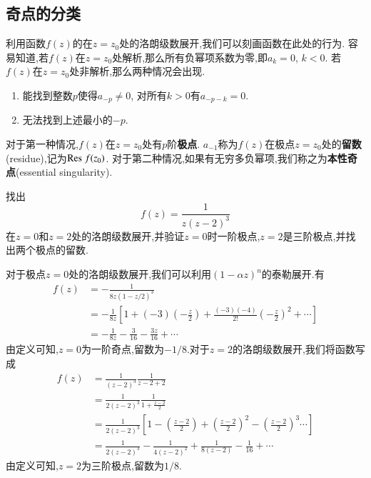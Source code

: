 \subsection{奇点的分类}
\label{subsec:singular_points}
利用函数$f(z)$的在$z=z_0$处的洛朗级数展开,我们可以刻画函数在此处的行为.
容易知道,若$f(z)$在$z=z_0$处解析,那么所有负幂项系数为零,即$a_k = 0$, $k<0$.
若$f(z)$在$z=z_0$处非解析,那么两种情况会出现.
\begin{enumerate}
    \item 能找到整数$p$使得$a_{-p} \neq 0$, 对所有$k>0$有$a_{-p - k}=0$.
    \item 无法找到上述最小的$-p$.
\end{enumerate}
对于第一种情况,$f(z)$在$z=z_0$处有$p$阶\textbf{极点}. $a_{-1}$称为$f(z)$在极点$z=z_0$处的\textbf{留数}(residue),记为${\mathrm{Res}\;} f(z_0)$.
对于第二种情况,如果有无穷多负幂项,我们称之为\textbf{本性奇点}(essential singularity).

\begin{example}
找出\[
    f(z) = \frac{1}{z( z- 2)^3} 
    \]
    在$z=0$和$z=2$处的洛朗级数展开,并验证$z=0$时一阶极点,$z=2$是三阶极点,并找出两个极点的留数.
\end{example}
\begin{solution}
对于极点$z=0$处的洛朗级数展开,我们可以利用$(1-\alpha z)^n$的泰勒展开.有
\[
    \begin{aligned}
    f(z) &= -\frac{1}{8z(1-z/2)^3}
    \\
     &= -\frac{1}{8z}\left[ 1 + (-3) (-\frac{z}{2}) + \frac{(-3)(-4)}{2!} \left( -\frac{z}{2}\right)^2 + \cdots \right] 
    \\
     &= -\frac{1}{8z} - \frac{3}{16} - \frac{3z}{16} + \cdots   
    \end{aligned}
\]
由定义可知,$z=0$为一阶奇点,留数为$-1/8$.对于$z=2$的洛朗级数展开,我们将函数写成
\[
    \begin{aligned}
        f(z) &= \frac{1}{(z-2)^3} \frac{1}{z-2 + 2}
        \\
        &= \frac{1}{2(z-2)^3} \frac{1}{1+\frac{z-2}{2}}
        \\
        &= \frac{1}{2(z-2)^3} \left[ 1 - \left(\frac{z-2}{2} \right) + \left(\frac{z-2}{2}\right)^2 - \left(\frac{z-2}{2}\right)^3 \cdots \right] 
        \\
        &= \frac{1}{2(z-2)^3} - \frac{1}{4(z-2)^2} + \frac{1}{8(z-2)} - \frac{1}{16} + \cdots
    \end{aligned}
\]
由定义可知,$z=2$为三阶极点,留数为$1/8$.
\end{solution}

